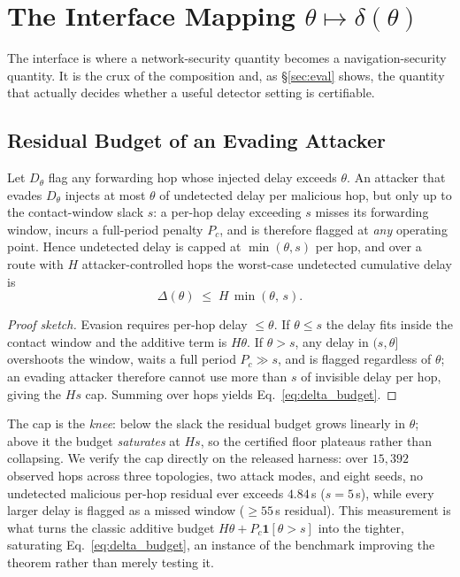 \section{The Interface Mapping $\theta \mapsto \delta(\theta)$}
\label{sec:interface}
The interface is where a network-security quantity becomes a navigation-security
quantity. It is the crux of the composition and, as \S\ref{sec:eval}
shows, the quantity that actually decides whether a useful detector setting is
certifiable.

\subsection{Residual Budget of an Evading Attacker}
\begin{lemma}
\label{lem:residual}
Let $D_\theta$ flag any forwarding hop whose injected delay exceeds $\theta$. An
attacker that evades $D_\theta$ injects at most $\theta$ of undetected delay per
malicious hop, but only up to the contact-window slack $s$: a per-hop delay
exceeding $s$ misses its forwarding window, incurs a full-period penalty
$P_{\!c}$, and is therefore flagged at \emph{any} operating point. Hence
undetected delay is capped at $\min(\theta,s)$ per hop, and over a route with
$H$ attacker-controlled hops the worst-case undetected cumulative delay is
\begin{equation}
\label{eq:delta_budget}
\Delta(\theta) \;\le\; H\,\min(\theta,\,s).
\end{equation}
\end{lemma}
\begin{proof}[Proof sketch]
Evasion requires per-hop delay $\le\theta$. If $\theta\le s$ the delay fits
inside the contact window and the additive term is $H\theta$. If $\theta>s$, any
delay in $(s,\theta]$ overshoots the window, waits a full period
$P_{\!c}\gg s$, and is flagged regardless of $\theta$; an evading attacker
therefore cannot use more than $s$ of invisible delay per hop, giving the $Hs$
cap. Summing over hops yields Eq.~\eqref{eq:delta_budget}.
\end{proof}

The cap is the \emph{knee}: below the slack the residual budget grows linearly
in $\theta$; above it the budget \emph{saturates} at $Hs$, so the certified
floor plateaus rather than collapsing. We verify the cap directly on the
released harness: over $15{,}392$ observed hops across three topologies, two
attack modes, and eight seeds, no undetected malicious per-hop residual ever
exceeds $4.84$\,s ($s=5$\,s), while every larger delay is flagged as a missed
window ($\ge55$\,s residual). This measurement is what turns the classic
additive budget $H\theta+P_{\!c}\mathbf{1}[\theta>s]$ into the tighter,
saturating Eq.~\eqref{eq:delta_budget}, an instance of the benchmark improving the
theorem rather than merely testing it.

